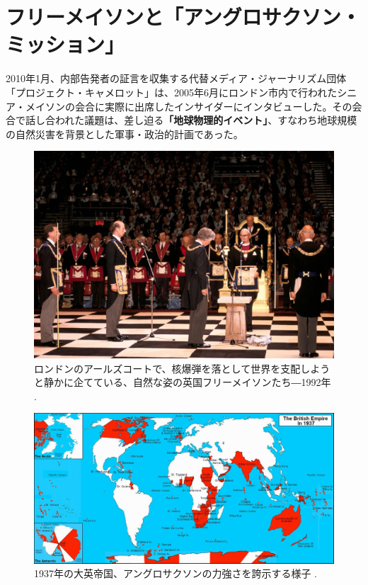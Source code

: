 \documentclass[10pt,twocolumn,letterpaper]{article}
\begin{document}
\section{フリーメイソンと「アングロサクソン・ミッション」}

2010年1月、内部告発者の証言を収集する代替メディア・ジャーナリズム団体「プロジェクト・キャメロット」は、2005年6月にロンドン市内で行われたシニア・メイソンの会合に実際に出席したインサイダーにインタビューした\cite{4,6}。その会合で話し合われた議題は、差し迫る\textbf{「地球物理的イベント」}、すなわち地球規模の自然災害を背景とした軍事・政治的計画であった。

\begin{figure}[b]
\begin{center}
   \includegraphics[width=1\linewidth]{freemason.jpg}

\end{center}
   \caption{ロンドンのアールズコートで、核爆弾を落として世界を支配しようと静かに企てている、自然な姿の英国フリーメイソンたち―1992年 \cite{5}.}
\label{fig:1}
\label{fig:onecol}
\end{figure}

\begin{figure}[t]
\begin{center}
\includegraphics[width=1\textwidth]{british.jpg}
\end{center}
   \caption{1937年の大英帝国、アングロサクソンの力強さを誇示する様子 \cite{14}.}
   \label{fig:2}
\end{figure}
\end{document}
